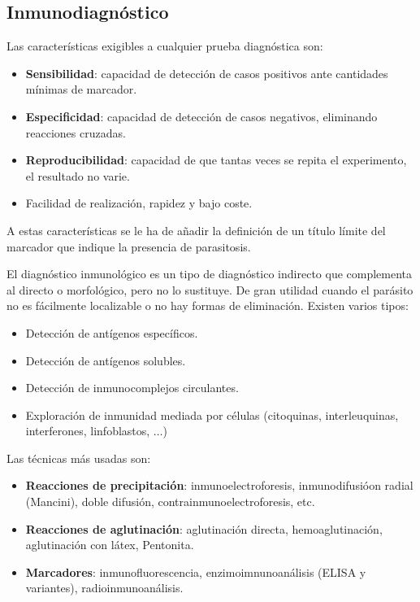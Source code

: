 \documentclass[10pt,a4paper,onecolumn,openany]{book}
\begin{document}
\subsection{Inmunodiagnóstico}
Las características exigibles a cualquier prueba diagnóstica son:
\begin{itemize}[itemsep=0pt,parsep=0pt,topsep=0pt,partopsep=0pt]
	\item \textbf{Sensibilidad}: capacidad de detección de casos positivos ante cantidades mínimas de marcador.
	\item\textbf{Especificidad}: capacidad de detección de casos negativos, eliminando reacciones cruzadas.
	\item\textbf{Reproducibilidad}: capacidad de que tantas veces se repita el experimento, el resultado no varie.
	\item Facilidad de realización, rapidez y bajo coste.
\end{itemize}
A estas características se le ha de añadir la definición de un título límite del marcador que indique la presencia de parasitosis.

El diagnóstico inmunológico es un tipo de diagnóstico indirecto que complementa al directo o morfológico, pero no lo sustituye. De gran utilidad cuando el parásito no es fácilmente localizable o no hay formas de eliminación. Existen varios tipos:
\begin{itemize}[itemsep=0pt,parsep=0pt,topsep=0pt,partopsep=0pt]
	\item Detección de antígenos específicos.
	\item Detección de antígenos solubles.
	\item Detección de inmunocomplejos circulantes.
	\item Exploración de inmunidad mediada por células (citoquinas, interleuquinas, interferones, linfoblastos, $\dots$)
\end{itemize}
Las técnicas más usadas son:
\begin{itemize}[itemsep=0pt,parsep=0pt,topsep=0pt,partopsep=0pt]
	\item \textbf{Reacciones de precipitación}: inmunoelectroforesis, inmunodifusióon radial (Mancini), doble difusión, contrainmunoelectroforesis, etc.
	\item\textbf{Reacciones de aglutinación}: aglutinación directa, hemoaglutinación, aglutinación con látex, Pentonita.
	\item\textbf{Marcadores}: inmunofluorescencia, enzimoimnunoanálisis (ELISA y variantes), radioinmunoanálisis.
\end{itemize}
\end{document}
